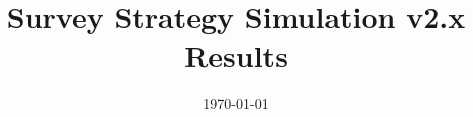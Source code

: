 \documentclass[modern]{aastex62}
\begin{document}

\date{\today}
\title{Survey Strategy Simulation v2.x Results}












\end{document}
